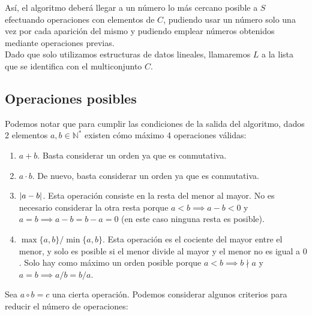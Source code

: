 Así, el algoritmo deberá llegar a un número lo más cercano posible a $S$
efectuando operaciones con elementos de $C$, pudiendo usar un número
solo una vez por cada aparición del mismo y pudiendo emplear números
obtenidos mediante operaciones previas. \\

Dado que solo utilizamos estructuras de datos lineales, llamaremos $L$ a la lista
que se identifica con el multiconjunto $C$.

\subsection{Operaciones posibles}

Podemos notar que para cumplir las condiciones de la salida del algoritmo,
dados 2 elementos $a,b \in \mathbb{N}^{\ast}$ existen cómo máximo 4 operaciones válidas:

\begin{enumerate}
	\item $a+b$. Basta considerar un orden ya que es conmutativa.
	\item $a\cdot b$. De nuevo, basta considerar un orden ya que es conmutativa.
	\item $|a-b|$. Esta operación consiste en la resta del menor al mayor.
	No es necesario considerar la otra resta porque $a < b \implies a-b < 0$ y
	$a = b \implies a-b = b-a = 0$ (en este caso ninguna resta es posible).
	\item $\max\{a,b\}/\min\{a,b\}$. Esta operación es el cociente del mayor entre
	el menor, y solo es posible si el menor divide al mayor y el menor no es igual
	a $0$. Solo hay como máximo un orden posible porque $a < b \implies b \nmid a$
	y $a = b \implies a/b = b/a$.
\end{enumerate}

Sea $a \circ b = c$ una cierta operación.
Podemos considerar algunos criterios para reducir el número de operaciones:

